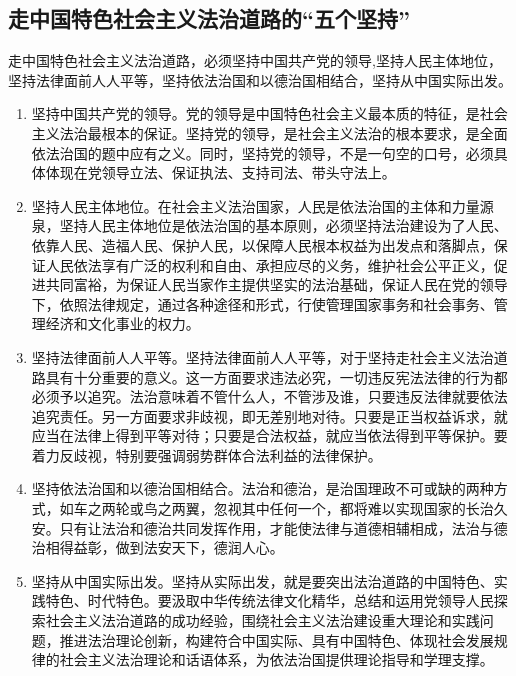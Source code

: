 \subsection{走中国特色社会主义法治道路的“五个坚持”}
走中国特色社会主义法治道路，必须坚持中国共产党的领导,坚持人民主体地位，坚持法律面前人人平等，坚持依法治国和以德治国相结合，坚持从中国实际出发。
\begin{enumerate}
\item 坚持中国共产党的领导。党的领导是中国特色社会主义最本质的特征，是社会主义法治最根本的保证。坚持党的领导，是社会主义法治的根本要求，是全面依法治国的题中应有之义。同时，坚持党的领导，不是一句空的口号，必须具体体现在党领导立法、保证执法、支持司法、带头守法上。
\item 坚持人民主体地位。在社会主义法治国家，人民是依法治国的主体和力量源泉，坚持人民主体地位是依法治国的基本原则，必须坚持法治建设为了人民、依靠人民、造福人民、保护人民，以保障人民根本权益为出发点和落脚点，保证人民依法享有广泛的权利和自由、承担应尽的义务，维护社会公平正义，促进共同富裕，为保证人民当家作主提供坚实的法治基础，保证人民在党的领导下，依照法律规定，通过各种途径和形式，行使管理国家事务和社会事务、管理经济和文化事业的权力。
\item 坚持法律面前人人平等。坚持法律面前人人平等，对于坚持走社会主义法治道路具有十分重要的意义。这一方面要求违法必究，一切违反宪法法律的行为都必须予以追究。法治意味着不管什么人，不管涉及谁，只要违反法律就要依法追究责任。另一方面要求非歧视，即无差别地对待。只要是正当权益诉求，就应当在法律上得到平等对待；只要是合法权益，就应当依法得到平等保护。要着力反歧视，特别要强调弱势群体合法利益的法律保护。
\item 坚持依法治国和以德治国相结合。法治和德治，是治国理政不可或缺的两种方式，如车之两轮或鸟之两翼，忽视其中任何一个，都将难以实现国家的长治久安。只有让法治和德治共同发挥作用，才能使法律与道德相辅相成，法治与德治相得益彰，做到法安天下，德润人心。
\item 坚持从中国实际出发。坚持从实际出发，就是要突出法治道路的中国特色、实践特色、时代特色。要汲取中华传统法律文化精华，总结和运用党领导人民探索社会主义法治道路的成功经验，围绕社会主义法治建设重大理论和实践问题，推进法治理论创新，构建符合中国实际、具有中国特色、体现社会发展规律的社会主义法治理论和话语体系，为依法治国提供理论指导和学理支撑。
\end{enumerate}

